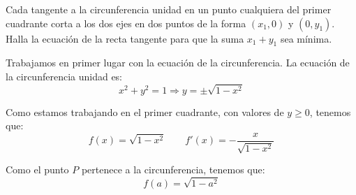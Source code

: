 \documentclass[12pt]{article}
\begin{document}
\begin{ejercicio} 
    Cada tangente a la circunferencia unidad en un punto cualquiera del primer cuadrante corta a los dos ejes en dos puntos de la forma $(x_1, 0)$ y $(0,y_1)$. Halla la ecuación de la recta tangente para que la suma $x_1+y_1$ sea mínima.

    \begin{figure}[H]
        \centering
    \end{figure}

    Trabajamos en primer lugar con la ecuación de la circunferencia. La ecuación de la circunferencia unidad es:
    \begin{equation*}
        x^2+y^2=1 \Longrightarrow y=\pm\sqrt{1-x^2}
    \end{equation*}

    Como estamos trabajando en el primer cuadrante, con valores de $y\geq 0$, tenemos que:
    \begin{equation*}
        f(x)=\sqrt{1-x^2} \qquad f'(x)=-\frac{x}{\sqrt{1-x^2}}
    \end{equation*}

    Como el punto $P$ pertenece a la circunferencia, tenemos que:
    \begin{equation*}
        f(a)=\sqrt{1-a^2}
    \end{equation*}


\end{ejercicio}
\end{document}
